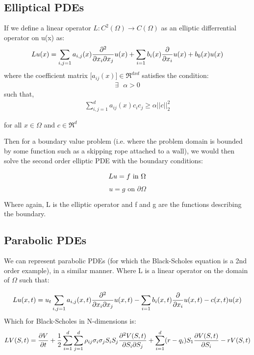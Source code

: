 \documentclass[a4paper]{amsart}
\begin{document}
\subsection{Elliptical PDEs} \label{EPDE}
If we define a linear operator $L : C^{2} (\Omega) \rightarrow C(\Omega)$ as an elliptic differrential operator on u(x) as:
\begin{equation}
Lu(x) = \sum_{i,j=1} a_{i,j}(x) \pdv{}{x_i}{x_j} u(x) + \sum_{i=1} b_{i}(x) \pdv{}{x_i} u(x) + b_{0}(x) u(x)
\label{EPDE}
\end{equation}
where the coefficient matrix $\big[ a_{ij}(x) \big] \in \Re^{dxd}$ satisfies the condition:
\begin{align*}
\exists \mbox{  } \alpha > 0
\end{align*}
 such that,
\begin{align*}
\sum_{i,j=1}^{d} a_{ij}(x)c_{i}c_{j}\geq \alpha||c||_{2}^{2}
\end{align*}

for all $ x \in \Omega$ and $c \in \Re^{d}$

Then for a boundary value problem (i.e. where the problem domain is bounded by some function such as a skipping rope attached to a wall), we would then solve the second order elliptic PDE with the boundary conditions:

\begin{equation} \label{eq:EPDE1}
Lu = f \mbox{ in } \Omega \\
\end{equation}
\begin{equation} \label{eq:EPDE2}
u = g \mbox{ on } \partial \Omega
\end{equation}

Where again, L is the elliptic operator and f and g are the functions describing the boundary.

\subsection{Parabolic PDEs}
We can represent parabolic PDEs (for which the Black-Scholes equation is a 2nd order example), in a similar manner. Where L is a linear operator on the domain of $\Omega$ such that:

\begin{equation}
Lu(x,t) = u_{t} \sum_{i,j=1} a_{i,j}(x,t) \pdv{}{x_i}{x_j} u(x,t) - \sum_{i=1} b_{i}(x,t) \pdv{}{x_i} u(x,t) - c(x,t) u(x)
\label{PPDE}
\end{equation}
Which for Black-Scholes in N-dimensions is:
\begin{equation}
LV(S,t) = \pdv{V}{t} + \frac{1}{2} \sum^{d}_{i=1} \sum^{d}_{j=1} \rho_{ij} \sigma_{i} \sigma_{j} S_{i} S_{j} \pdv{V(S,t)}{S_{i}}{S_{j}}+ \sum^{d}_{i=1}(r-q_{i})S_{1} \pdv{V(S,t)}{S_{i}} - rV(S,t)
\end{equation}
\end{document}
